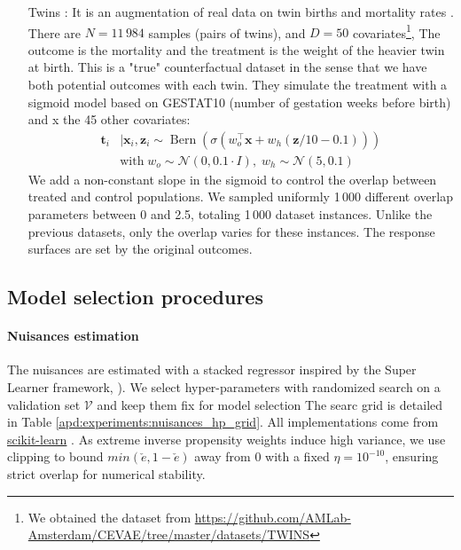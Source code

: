 \documentclass[unnumsec,webpdf,contemporary,large]{oup-authoring-template}%
\theoremstyle{thmstyleone}%
\theoremstyle{thmstyletwo}%
\theoremstyle{thmstylethree}%
\begin{document}
\begin{appendices}
\begin{itemize}
        \item[Twins] \cite{louizos_causal_2017}: It is an augmentation of
            real data on twin births and mortality rates
            \cite{almond_costs_2005}. There are $N=11\,984$ samples (pairs of twins),
            and $D=50$ covariates\footnote{We obtained the dataset from
                \href{https://github.com/AMLab-Amsterdam/CEVAE/tree/master/datasets/TWINS}{https://github.com/AMLab-Amsterdam/CEVAE/tree/master/datasets/TWINS}}, The outcome is the mortality and the treatment is the
            weight of the heavier twin at birth. This is a "true" counterfactual dataset
            \cite{curth_really_2021} in the sense that we have
            both potential outcomes with each twin. They simulate the treatment with a
            sigmoid model based on GESTAT10 (number of gestation weeks before birth) and x
            the 45 other covariates:
            \begin{align}
                \mathbf{t}_{i} & \mid \mathbf{x}_{i}, \mathbf{z}_{i} \sim
                \operatorname{Bern}\left(\sigma\left(w_{o}^{\top}
                \mathbf{x}+w_{h}(\mathbf{z} / 10-0.1)\right)\right)       \\ & \text{with} \;
                w_{o} \sim \mathcal{N}(0,0.1 \cdot I),\; w_{h} \sim \mathcal{N}(5,0.1) \nonumber
            \end{align}
            We add a non-constant slope in the
            sigmoid to control the overlap between
            treated and control populations.
            We sampled uniformly 1\,000 different overlap parameters between 0 and
            2.5, totaling 1\,000 dataset instances. Unlike the previous datasets,
            only the overlap varies for these instances. The response surfaces are
            set by the original outcomes.
    \end{itemize}

    \subsection{Model selection procedures}

    \paragraph{Nuisances estimation}\label{apd:experiments:nuisances_hp}

    The nuisances are estimated with a stacked regressor inspired by the Super
    Learner framework, \cite{laan_super_2007}). We select hyper-parameters
    with randomized search on a validation set $\mathcal{V}$ and keep them fix for
    model selection  The searc grid is detailed in Table
    \ref{apd:experiments:nuisances_hp_grid}. All implementations come from
    \href{https://scikit-learn.org/stable/}{scikit-learn}
    \cite{pedregosa_scikitlearn_2011}.  As extreme inverse propensity weights induce
    high variance, we use clipping \cite{swaminathan_counterfactual_2015,
        ionides_truncated_2008} to bound $min(\check e, 1-\check e)$ away from 0 with a
    fixed $\eta=10^{-10}$, ensuring strict overlap for numerical stability.


\end{appendices}
\end{document}
